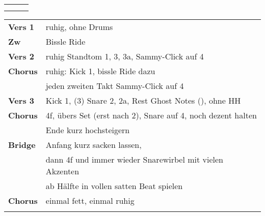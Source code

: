 

\begin{tabular}{p{0.6cm}p{12cm}p{1.4cm}}
	\rowcolor{cyan} \myRow{\thesongnumber} & \myRow{Gotteslamm} & \myRow{70} \\
	                                       &                    &            \\
\end{tabular}

\begin{tabular}{p{1.6cm}l}
	\textbf{Vers 1} & ruhig, ohne Drums                                                             \\
	\textbf{Zw}     & Bissle Ride                                                                   \\
	\textbf{Vers 2} & ruhig Standtom 1, 3, 3a, Sammy-Click auf 4                                    \\
	\textbf{Chorus} & ruhig: Kick 1, bissle Ride dazu                                               \\
	                & jeden zweiten Takt Sammy-Click auf 4                                          \\
	\textbf{Vers 3} & Kick 1, (3) Snare 2, 2a, Rest Ghost Notes (\sechzehntel), ohne HH             \\
	\textbf{Chorus} & 4f, übers Set (erst nach 2), Snare auf 4, noch dezent halten                  \\
	                & Ende kurz \achtel hochsteigern                                                \\
	\textbf{Bridge} & Anfang kurz sacken lassen,                                                    \\ %
	                & dann 4f und immer wieder Snarewirbel mit vielen Akzenten                      \\ %
	                & ab Hälfte in vollen satten Beat spielen                                       \\ %
	\textbf{Chorus} & einmal fett, einmal ruhig                                                     \\ %
	                &                                                                               \\
\end{tabular}
